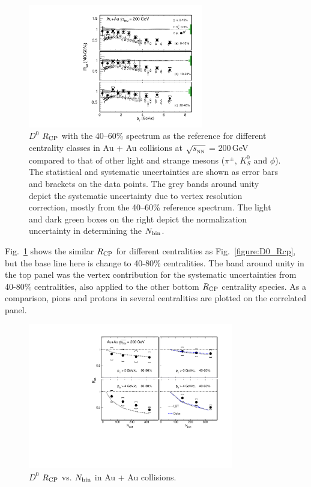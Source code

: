 \begin{figure}
\centering
\includegraphics[width=0.68\textwidth]{figure/Run14_D0HFT/D0_Rcp2.pdf}
\caption{$D^{0}$ $R_{\rm CP}$ with the 40--60\% spectrum as the reference for different centrality classes in Au + Au collisions at $\sqrt{s_{_{\rm NN}}}$ = 200\,GeV compared to that of other light and strange mesons ($\pi^{\pm}$, $K^0_{S}$ and $\phi$). The statistical and systematic uncertainties are shown as error bars and brackets on the data points. The grey bands around unity depict the systematic uncertainty due to vertex resolution correction, mostly from the 40--60\% reference spectrum. The light and dark green boxes on the right depict the normalization uncertainty in determining the $N_{\rm bin}$.}
\label{figure:D0_Rcp2} 
\end{figure}

Fig.~\ref{figure:D0_Rcp2} shows the similar $R_{\rm CP}$ for different centralities as Fig.~\ref{figure:D0_Rcp}, but the base line here is change to 40-80\% centralities. The band around unity in the top panel was the vertex contribution for the systematic uncertainties from 40-80\% centralities, also applied to the other bottom $R_{\rm CP}$ centrality species. As a comparison, pions and protons in several centralities are plotted on the correlated panel.

\begin{figure}
\centering
\includegraphics[width=0.8\textwidth]{figure/Run14_D0HFT/Rcp_Nbin_D0.pdf}
\caption{$D^{0}$ $R_{\rm CP}$ vs. $N_{\rm bin}$ in Au + Au collisions.}
\label{figure/Rcp_Nbin_D0} 
\end{figure}


